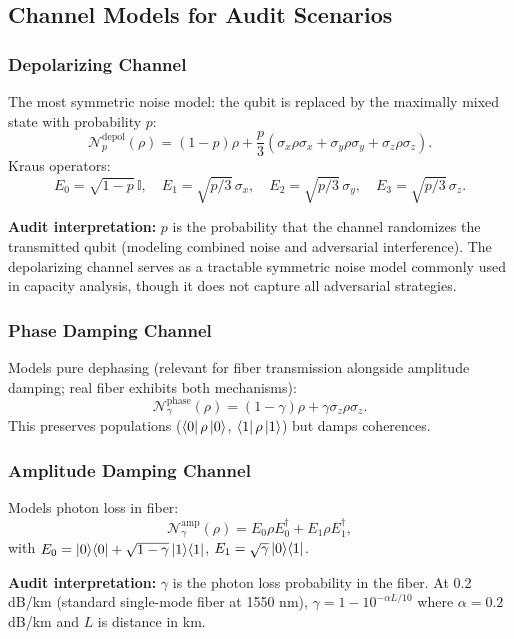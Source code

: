 \documentclass[11pt,a4paper]{article}
\theoremstyle{plain}
\theoremstyle{definition}
\theoremstyle{remark}
\newcommand{\cN}{\mathcal{N}}
\newcommand{\id}{\mathbb{I}}
\newcommand{\ketbra}[2]{\ket{#1}\!\bra{#2}}
\newcommand{\pauliX}{\sigma_x}
\newcommand{\pauliY}{\sigma_y}
\newcommand{\pauliZ}{\sigma_z}
\begin{document}
\subsection{Channel Models for Audit Scenarios}
\label{sec:channel_models}

\subsubsection{Depolarizing Channel}

The most symmetric noise model: the qubit is replaced by the maximally
mixed state with probability $p$:
\[
\cN_p^{\text{depol}}(\rho) = (1-p)\rho + \frac{p}{3}(\pauliX\rho\pauliX +
\pauliY\rho\pauliY + \pauliZ\rho\pauliZ).
\label{eq:depol_channel}
\]
Kraus operators:
\[
E_0 = \sqrt{1-p}\,\id, \quad
E_1 = \sqrt{p/3}\,\pauliX, \quad
E_2 = \sqrt{p/3}\,\pauliY, \quad
E_3 = \sqrt{p/3}\,\pauliZ.
\]

\textbf{Audit interpretation:} $p$ is the probability that the channel
randomizes the transmitted qubit (modeling combined noise and adversarial
interference). The depolarizing channel serves as a tractable symmetric
noise model commonly used in capacity analysis, though it does not
capture all adversarial strategies.

\subsubsection{Phase Damping Channel}

Models pure dephasing (relevant for fiber transmission alongside
amplitude damping; real fiber exhibits both mechanisms):
\[
\cN_{\gamma}^{\text{phase}}(\rho) = (1-\gamma)\rho + \gamma\pauliZ\rho\pauliZ.
\]
This preserves populations ($\bra{0}\rho\ket{0}$, $\bra{1}\rho\ket{1}$)
but damps coherences.

\subsubsection{Amplitude Damping Channel}

Models photon loss in fiber:
\[
\cN_{\gamma}^{\text{amp}}(\rho) = E_0\rho E_0^\dagger + E_1\rho E_1^\dagger,
\]
with $E_0 = \ketbra{0}{0} + \sqrt{1-\gamma}\ketbra{1}{1}$,
$E_1 = \sqrt{\gamma}\ketbra{0}{1}$.

\textbf{Audit interpretation:} $\gamma$ is the photon loss probability in
the fiber. At 0.2 dB/km (standard single-mode fiber at 1550 nm),
$\gamma = 1 - 10^{-\alpha L / 10}$ where $\alpha = 0.2$ dB/km and $L$ is
distance in km.
\end{document}
